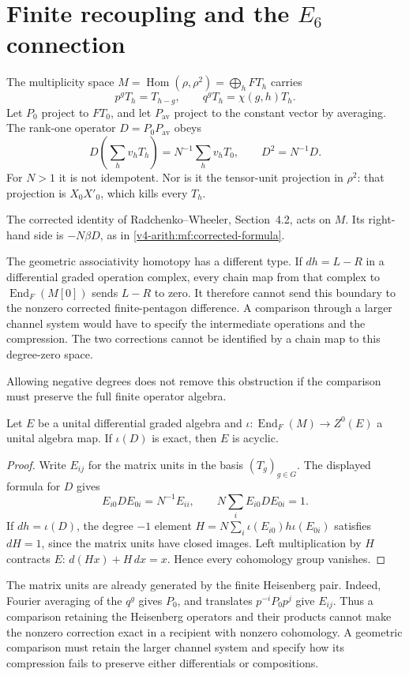 \section{Finite recoupling and the \texorpdfstring{$E_6$}{E6} connection}

The multiplicity space
$M=\operatorname{Hom}(\rho,\rho^2)=\bigoplus_hFT_h$ carries
\[
 p^gT_h=T_{h-g},\qquad q^gT_h=\chi(g,h)T_h.
\]
Let $P_0$ project to $FT_0$, and let $P_{\mathrm{av}}$ project to the
constant vector by averaging. The rank-one operator
$D=P_0P_{\mathrm{av}}$ obeys
\[
 D\left(\sum_hv_hT_h\right)=N^{-1}\sum_hv_hT_0,\qquad D^2=N^{-1}D.
\]
For $N>1$ it is not idempotent. Nor is it the tensor-unit projection in
$\rho^2$: that projection is $X_0X'_0$, which kills every $T_h$.

The corrected identity of Radchenko--Wheeler, Section~4.2,
acts on \(M\). Its right-hand side is \(-N\beta D\), as in
\eqref{v4-arith:mf:corrected-formula}.

The geometric associativity homotopy has a different type. If
$dh=L-R$ in a differential graded operation complex, every chain map from that complex
to $\operatorname{End}_F(M[0])$ sends $L-R$ to zero. It therefore cannot
send this boundary to the nonzero corrected finite-pentagon difference.
A comparison through a larger channel system would have to specify the
intermediate operations and the compression. The two corrections cannot
be identified by a chain map to this degree-zero space.

Allowing negative degrees does not remove this obstruction if the
comparison must preserve the full finite operator algebra.
\begin{proposition}\label{v4-arith:asi:exact-correction}
Let $E$ be a unital differential graded algebra and
$\iota:\operatorname{End}_F(M)\to Z^0(E)$ a unital algebra map.
If $\iota(D)$ is exact, then $E$ is acyclic.
\end{proposition}
\begin{proof}
Write $E_{ij}$ for the matrix units in the basis $(T_g)_{g\in G}$.
The displayed formula for $D$ gives
\[
 E_{i0}DE_{0i}=N^{-1}E_{ii},\qquad
 N\sum_iE_{i0}DE_{0i}=1.
\]
If $dh=\iota(D)$, the degree $-1$ element
$H=N\sum_i\iota(E_{i0})h\iota(E_{0i})$ satisfies $dH=1$,
since the matrix units have closed images. Left multiplication by $H$
contracts $E$: $d(Hx)+H\,dx=x$. Hence every cohomology group vanishes.
\end{proof}

The matrix units are already generated by the finite Heisenberg pair.
Indeed, Fourier averaging of the $q^g$ gives $P_0$, and translates
$p^{-i}P_0p^j$ give $E_{ij}$. Thus a comparison retaining the Heisenberg
operators and their products cannot make the nonzero correction exact
in a recipient with nonzero cohomology. A geometric comparison must
retain the larger channel system and specify how its compression fails
to preserve either differentials or compositions.

